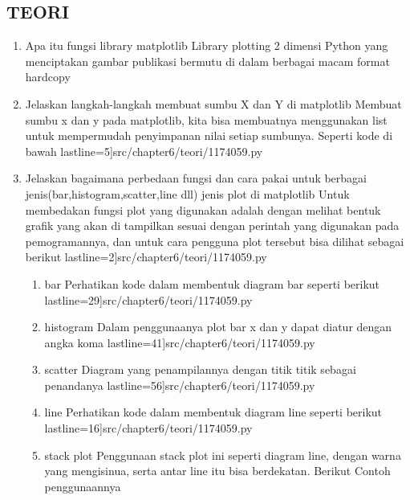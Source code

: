 	\subsection {TEORI}
	\begin {enumerate}
		\item  Apa itu fungsi library matplotlib
			\newline Library plotting 2 dimensi Python yang menciptakan gambar publikasi bermutu di dalam berbagai macam format hardcopy
		\item Jelaskan langkah-langkah membuat sumbu X dan Y di matplotlib
			\newline  Membuat sumbu x dan y pada matplotlib, kita bisa membuatnya menggunakan list untuk mempermudah penyimpanan nilai setiap sumbunya. Seperti kode di bawah
			 lastline=5]{src/chapter6/teori/1174059.py}
		\item Jelaskan bagaimana perbedaan fungsi dan cara pakai untuk berbagai jenis(bar,histogram,scatter,line dll) jenis plot di matplotlib
			\newline Untuk membedakan fungsi plot yang digunakan adalah dengan melihat bentuk grafik yang akan di tampilkan sesuai dengan perintah yang digunakan pada pemogramannya, dan untuk cara pengguna plot tersebut bisa dilihat sebagai berikut
			 lastline=2]{src/chapter6/teori/1174059.py}
				\begin {enumerate}
					\item bar 
					\newline Perhatikan kode dalam membentuk diagram bar seperti berikut
						 lastline=29]{src/chapter6/teori/1174059.py}
					\item histogram
					\newline Dalam penggunaanya plot bar x dan y dapat diatur dengan angka koma
						 lastline=41]{src/chapter6/teori/1174059.py}
					\item scatter
					\newline Diagram yang penampilannya dengan titik titik sebagai penandanya
						 lastline=56]{src/chapter6/teori/1174059.py}
					\item line
					\newline Perhatikan kode dalam membentuk diagram line seperti berikut
						 lastline=16]{src/chapter6/teori/1174059.py}
					\item stack plot
					\newline Penggunaan stack plot ini seperti diagram line, dengan warna yang mengisinua, serta antar line itu bisa berdekatan. Berikut Contoh penggunaannya

\end{enumerate}
\end{enumerate}
